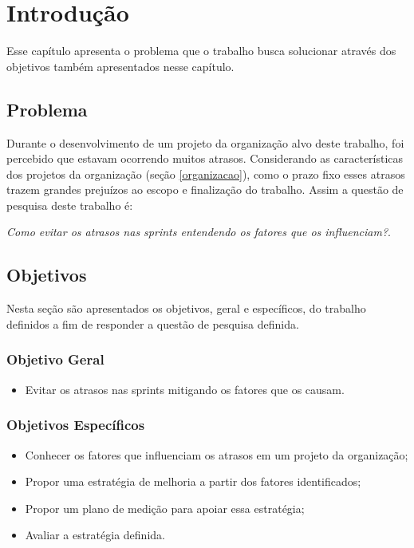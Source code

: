 \chapter[Introdução]{Introdução}

Esse capítulo apresenta o problema que o trabalho busca solucionar através dos objetivos também apresentados nesse capítulo.

\section{Problema}

Durante o desenvolvimento de um projeto da organização alvo deste trabalho, foi percebido que estavam ocorrendo muitos
atrasos. Considerando as características dos projetos da organização (seção \ref{organizacao}), como o prazo fixo
esses atrasos trazem grandes prejuízos ao escopo e finalização do trabalho. Assim a questão de pesquisa deste trabalho é:

\begin{centering}
 \textit{Como evitar os atrasos nas sprints entendendo os fatores que os influenciam?}.
\end{centering}

\vfill
\pagebreak
  
\section{Objetivos}

  Nesta seção são apresentados os objetivos, geral e específicos, do trabalho definidos a fim de responder a questão de pesquisa definida.

\subsection{Objetivo Geral}

\begin{itemize}
  \item Evitar os atrasos nas sprints mitigando os fatores que os causam.
\end{itemize}

\subsection{Objetivos Específicos}

\begin{itemize}
  \item Conhecer os fatores que influenciam os atrasos em um projeto da organização;
  \item Propor uma estratégia de melhoria a partir dos fatores identificados;
  \item Propor um plano de medição para apoiar essa estratégia;
  \item Avaliar a estratégia definida.
\end{itemize}

\vfill
\pagebreak

